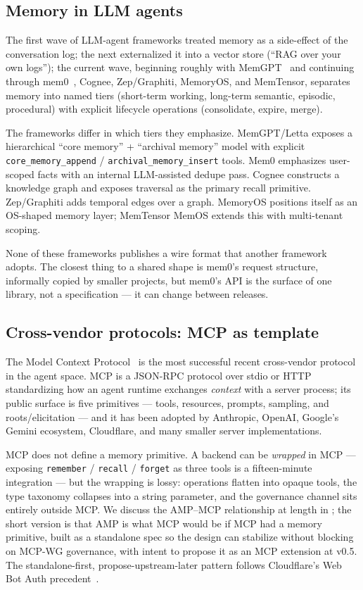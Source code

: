 \documentclass[11pt,letterpaper,twocolumn]{article}
\begin{document}
\subsection{Memory in LLM agents}

The first wave of LLM-agent frameworks treated memory as a side-effect of the conversation log; the next externalized it into a vector store (``RAG over your own logs''); the current wave, beginning roughly with MemGPT~\cite{packer2023memgpt} and continuing through mem0~\cite{chhikara2025mem0}, Cognee, Zep/Graphiti, MemoryOS, and MemTensor, separates memory into named tiers (short-term working, long-term semantic, episodic, procedural) with explicit lifecycle operations (consolidate, expire, merge).

The frameworks differ in which tiers they emphasize. MemGPT/Letta exposes a hierarchical ``core memory'' + ``archival memory'' model with explicit \texttt{core\_memory\_append} / \texttt{archival\_memory\_insert} tools. Mem0 emphasizes user-scoped facts with an internal LLM-assisted dedupe pass. Cognee constructs a knowledge graph and exposes traversal as the primary recall primitive. Zep/Graphiti adds temporal edges over a graph. MemoryOS positions itself as an OS-shaped memory layer; MemTensor MemOS extends this with multi-tenant scoping.

None of these frameworks publishes a wire format that another framework adopts. The closest thing to a shared shape is mem0's request structure, informally copied by smaller projects, but mem0's API is the surface of one library, not a specification --- it can change between releases.

\subsection{Cross-vendor protocols: MCP as template}

The Model Context Protocol~\cite{mcp_spec_2025} is the most successful recent cross-vendor protocol in the agent space. MCP is a JSON-RPC protocol over stdio or HTTP standardizing how an agent runtime exchanges \emph{context} with a server process; its public surface is five primitives --- tools, resources, prompts, sampling, and roots/elicitation --- and it has been adopted by Anthropic, OpenAI, Google's Gemini ecosystem, Cloudflare, and many smaller server implementations.

MCP does not define a memory primitive. A backend can be \emph{wrapped} in MCP --- exposing \texttt{remember} / \texttt{recall} / \texttt{forget} as three tools is a fifteen-minute integration --- but the wrapping is lossy: operations flatten into opaque tools, the type taxonomy collapses into a string parameter, and the governance channel sits entirely outside MCP. We discuss the AMP--MCP relationship at length in ; the short version is that AMP is what MCP would be if MCP had a memory primitive, built as a standalone spec so the design can stabilize without blocking on MCP-WG governance, with intent to propose it as an MCP extension at v0.5. The standalone-first, propose-upstream-later pattern follows Cloudflare's Web Bot Auth precedent~\cite{meunier2026webbotauth}.
\end{document}
